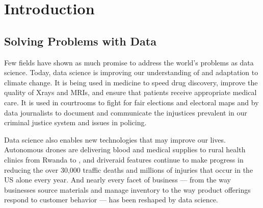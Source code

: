 \documentclass[letterpaper,10pt,english]{jupyterBook}
\begin{document}
\part{Introduction}

\sphinxstepscope


\chapter{Solving Problems with Data}
\label{\detokenize{10_introduction/10_solving_problems_with_data:solving-problems-with-data}}\label{\detokenize{10_introduction/10_solving_problems_with_data::doc}}
\sphinxAtStartPar
Few fields have shown as much promise to address the world’s problems as data science. Today, data science is improving our understanding of and adaptation to climate change. It is being used in medicine to speed drug discovery, improve the quality of X\sphinxhyphen{}rays and MRIs, and ensure that patients receive appropriate medical care. It is used in courtrooms to fight for fair elections and electoral maps and by data journalists to document and communicate the injustices prevalent in our criminal justice system and issues in policing.

\sphinxAtStartPar
Data science also enables new technologies that may improve our lives. Autonomous drones are delivering blood and medical supplies to rural health clinics from Rwanda to , and driver\sphinxhyphen{}aid features continue to make progress in reducing the over 30,000 traffic deaths and millions of injuries that occur in the US alone every year. And nearly every facet of business — from the way businesses source materials and manage inventory to the way product offerings respond to customer behavior — has been reshaped by data science.
\end{document}
